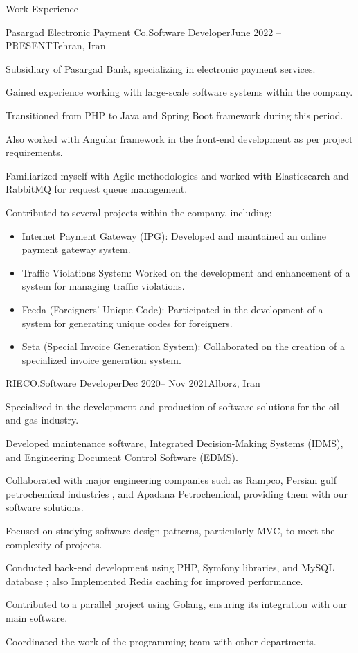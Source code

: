 \documentclass[]{kyvernitis-resume}
\begin{document}
\begin{section}{Work Experience}
    \begin{subsection}{Pasargad Electronic Payment Co.}{Software Developer}{June 2022 -- PRESENT}{Tehran, Iran}

     		\item Subsidiary of Pasargad Bank, specializing in electronic payment services.
		\item Gained experience working with large-scale software systems within the company.
		\item Transitioned from PHP to Java and Spring Boot framework during this period.
		\item Also worked with Angular framework in the front-end development as per project requirements.
		\item Familiarized myself with Agile methodologies and worked with Elasticsearch and RabbitMQ for request queue management.
		\item Contributed to several projects within the company, including:
		
		\begin{itemize}[label={}, leftmargin=1cm]
		  \item Internet Payment Gateway (IPG): Developed and maintained an online payment gateway system.
		  \item Traffic Violations System: Worked on the development and enhancement of a system for managing traffic violations.
		  \item Feeda (Foreigners' Unique Code): Participated in the development of a system for generating unique codes for foreigners.
		  \item Seta (Special Invoice Generation System): Collaborated on the creation of a specialized invoice generation system.
		\end{itemize}

    \end{subsection}

 \begin{subsection}{RIECO.}{Software Developer}{Dec 2020-- Nov 2021}{Alborz, Iran}
       	\item Specialized in the development and production of software solutions for the oil and gas industry.
	\item Developed maintenance software, Integrated Decision-Making Systems (IDMS), and Engineering Document Control Software (EDMS).
	\item Collaborated with major engineering companies such as Rampco, Persian gulf petrochemical industries , and Apadana Petrochemical, providing them with our software solutions.
	\item Focused on studying software design patterns, particularly MVC, to meet the complexity of projects.
	\item Conducted back-end development using PHP, Symfony libraries, and MySQL database ; also Implemented Redis caching for improved performance.
	\item Contributed to a parallel project using Golang, ensuring its integration with our main software.
	\item Coordinated the work of the programming team with other departments.


\end{subsection}
\end{section}
\end{document}
